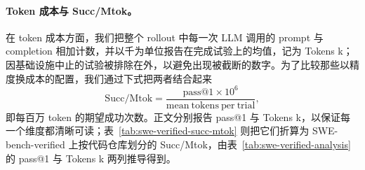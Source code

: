 \paragraph{Token 成本与 Succ/Mtok。}
在 token 成本方面，我们把整个 rollout 中每一次 LLM 调用的 prompt 与 completion 相加计数，并以千为单位报告在完成试验上的均值，记为 Tokens k；因基础设施中止的试验被排除在外，以避免出现被截断的数字。为了比较那些以精度换成本的配置，我们通过下式把两者结合起来
\begin{equation}
    \mathrm{Succ/Mtok} = \frac{\mathrm{pass@1} \times 10^{6}}{\mathrm{mean\ tokens\ per\ trial}},
\end{equation}
即每百万 token 的期望成功次数。正文分别报告 pass@1 与 Tokens k，以保证每一个维度都清晰可读；表~\ref{tab:swe-verified-succ-mtok} 则把它们折算为 SWE-bench-verified 上按代码仓库划分的 Succ/Mtok，由表~\ref{tab:swe-verified-analysis} 的 pass@1 与 Tokens k 两列推导得到。


